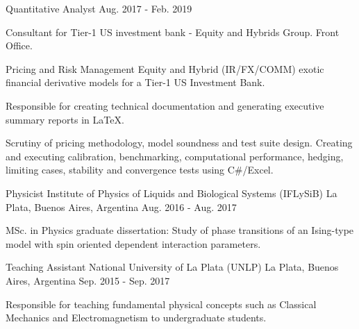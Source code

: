 \begin{cventries}
  \cventry
    {Quantitative Analyst} %
    {} %
    {} %
    {Aug. 2017 - Feb. 2019} %
    {
      \begin{cvitems} %
        \item{Consultant for Tier-1 US investment bank - Equity and Hybrids Group. Front Office.}
        \item {Pricing and Risk Management Equity and Hybrid (IR/FX/COMM) exotic financial derivative models for a Tier-1 US Investment Bank.}
        \item {Responsible for creating technical documentation and generating executive summary reports in \LaTeX.}
        \item{Scrutiny of pricing methodology, model soundness and test suite design. Creating and executing calibration, benchmarking, computational performance, hedging, limiting cases, stability and convergence tests using C\#/Excel.}
      \end{cvitems}
    }

  \cventry
    {Physicist} %
    {Institute of Physics of Liquids and Biological Systems (IFLySiB) \href{https://mattborghi.github.io/projects/MSc\%20Thesis/}{\faGithub}} %
    {La Plata, Buenos Aires, Argentina} %
    {Aug. 2016 - Aug. 2017} %
    {
      \begin{cvitems} %
        \item {MSc. in Physics graduate dissertation: Study of phase transitions of an Ising-type model with spin oriented dependent interaction parameters.}
      \end{cvitems}
    }

  \cventry
    {Teaching Assistant} %
    {National University of La Plata (UNLP)} %
    {La Plata, Buenos Aires, Argentina} %
    {Sep. 2015 - Sep. 2017} %
    {
      \begin{cvitems} %
        \item {Responsible for teaching fundamental physical concepts such as Classical Mechanics and Electromagnetism to undergraduate students.}
      \end{cvitems}
    }


\end{cventries}
